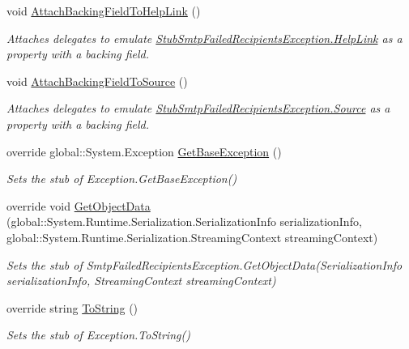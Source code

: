 \begin{DoxyCompactItemize}
void \hyperlink{class_system_1_1_net_1_1_mail_1_1_fakes_1_1_stub_smtp_failed_recipients_exception_ad650b2663eac290d57ba330587b1198d}{Attach\-Backing\-Field\-To\-Help\-Link} ()
\begin{DoxyCompactList}\small\item\em Attaches delegates to emulate \hyperlink{class_system_1_1_net_1_1_mail_1_1_fakes_1_1_stub_smtp_failed_recipients_exception_a3ef13f20d24a6c224d0bfb1c1513522d}{Stub\-Smtp\-Failed\-Recipients\-Exception.\-Help\-Link} as a property with a backing field.\end{DoxyCompactList}\item 
void \hyperlink{class_system_1_1_net_1_1_mail_1_1_fakes_1_1_stub_smtp_failed_recipients_exception_a4bba6ce712ccb3901d82a1c377cf85c2}{Attach\-Backing\-Field\-To\-Source} ()
\begin{DoxyCompactList}\small\item\em Attaches delegates to emulate \hyperlink{class_system_1_1_net_1_1_mail_1_1_fakes_1_1_stub_smtp_failed_recipients_exception_a18feb7b57d1e50856f72688821fe5c9e}{Stub\-Smtp\-Failed\-Recipients\-Exception.\-Source} as a property with a backing field.\end{DoxyCompactList}\item 
override global\-::\-System.\-Exception \hyperlink{class_system_1_1_net_1_1_mail_1_1_fakes_1_1_stub_smtp_failed_recipients_exception_a841f1c8f5c9723e6a61e1a04d4731f74}{Get\-Base\-Exception} ()
\begin{DoxyCompactList}\small\item\em Sets the stub of Exception.\-Get\-Base\-Exception()\end{DoxyCompactList}\item 
override void \hyperlink{class_system_1_1_net_1_1_mail_1_1_fakes_1_1_stub_smtp_failed_recipients_exception_a7903a5f56e341c5fa01bf6316eb95c09}{Get\-Object\-Data} (global\-::\-System.\-Runtime.\-Serialization.\-Serialization\-Info serialization\-Info, global\-::\-System.\-Runtime.\-Serialization.\-Streaming\-Context streaming\-Context)
\begin{DoxyCompactList}\small\item\em Sets the stub of Smtp\-Failed\-Recipients\-Exception.\-Get\-Object\-Data(\-Serialization\-Info serialization\-Info, Streaming\-Context streaming\-Context)\end{DoxyCompactList}\item 
override string \hyperlink{class_system_1_1_net_1_1_mail_1_1_fakes_1_1_stub_smtp_failed_recipients_exception_afbc92ab833d4d6474009cb3a21c2a72e}{To\-String} ()
\begin{DoxyCompactList}\small\item\em Sets the stub of Exception.\-To\-String()\end{DoxyCompactList}\end{DoxyCompactItemize}
